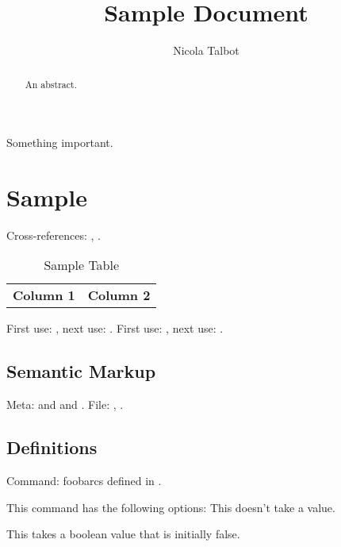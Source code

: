 \documentclass[titlepage=false,oneside,
 fontsize=12pt,captions=tableheading]{scrbook}
\title{Sample Document}
\author{Nicola Talbot}
\begin{document}
\maketitle

\begin{important}
Something important.
\end{important}

\begin{abstract}
An abstract.
\end{abstract}

\frontmatter
\tableofcontents
\listofexamples

\mainmatter
\chapter{Sample}\label{ch:sample}

Cross-references: , .

\begin{table}[htbp]
\caption{Sample Table}
\label{tab:sample}
\centering
\begin{tabular}{ll}
\bfseries Column 1 &
\bfseries Column 2 \\
\end{tabular}
\end{table}

First use: , next use: .
First use: , next use: .

\section{Semantic Markup}\label{sec:semantic}

Meta:  and  and .
File: , 
. 

\section{Definitions}\label{sec:defs}

Command: \gls{foobarcs} defined in .


This command has the following options:
This doesn't take a value.

This takes a boolean value that is initially false.
\end{document}
